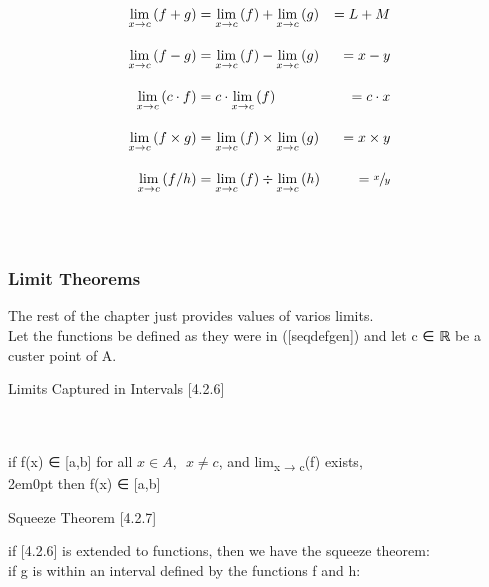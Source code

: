 \[\begin{aligned} {2}
\lim_{x\rightarrow c}
\left( f+g \right) &=
\lim_{x\rightarrow
c}\left( f \right) +
\lim_{x\rightarrow
c}\left( g \right) &= L + M
\label{addlimdef}
\\[1em]
\lim_{x\rightarrow c}
\left( f-g \right) &=
\lim_{x\rightarrow c}
\left( f \right) -
\lim_{x\rightarrow c}
\left( g \right) &= x - y
\label{minlimdef}
\\[1em]
\lim_{x\rightarrow c}
\left( c \cdot f \right)
&= c \cdot
\lim_{x\rightarrow c}
\left( f \right) &= c
\cdot x \label{conmultlimdef}
\\[1em]
\lim_{x\rightarrow c}
\left( f\times g \right)
&= \lim_{x\rightarrow c}
\left( f \right) \times
\lim_{x\rightarrow c}
\left( g \right) &= x
\times y \label{multlimdef}
\\[1em]
\lim_{x\rightarrow c}
\left( f/h \right) &=
\lim_{x\rightarrow c}
\left( f \right) \div
\lim_{x\rightarrow c}
\left( h \right) &=
\sfrac{x}{y}
\label{divlimdef}\end{aligned}\]\\

\hypertarget{limit-theorems}{%
\subsubsection[\hfill\break
Limit
Theorems]{\texorpdfstring{\protect\hypertarget{SECTION00012300000000000000}{}{}\protect\hypertarget{limit-theorems}{}{}~\\
Limit Theorems}{ Limit Theorems}}\label{limit-theorems}}

The rest of the chapter just provides values of varios limits.\\
Let the functions be defined as they were in ({[}seqdefgen{]}) and let
{c} ∈ ℝ be a custer point of {A}.

Limits Captured in Intervals
{[}4.2.6{]}\protect\hypertarget{limits-captured-in-intervals-4.2.6}{}{}

~\\
~\\
{if} {f}({x}) ∈ {[}{a},{b}{]} for all \(x \in A, \enspace x \neq c\),
and lim\textsubscript{{x} → {c}}({f}) exists,\\

2em0pt {then} {f}({x}) ∈ {[}{a},{b}{]}

Squeeze Theorem
{[}4.2.7{]}\protect\hypertarget{squeeze-theorem-4.2.7}{}{}

if {[}4.2.6{]} is extended to functions, then we have the squeeze
theorem:\\
{if} {g} is within an interval defined by the functions {f} and {h}:

